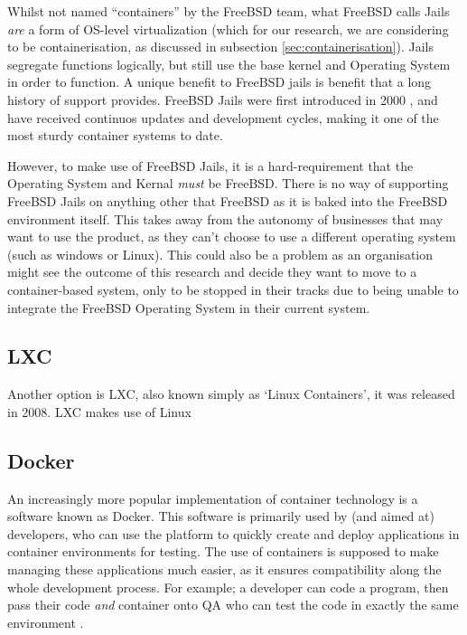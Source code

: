 Whilst not named ``containers'' by the FreeBSD team, what FreeBSD calls Jails \emph{are} a form of OS-level virtualization (which for our research, we are considering to be containerisation, as discussed in subsection \ref{sec:containerisation}). Jails segregate functions logically, but still use the base kernel and Operating System in order to function. A unique benefit to FreeBSD jails is benefit that a long history of support provides. FreeBSD Jails were first introduced in 2000 \citep{FreeBSDJailRelease}, and have received continuos updates and development cycles, making it one of the most sturdy container systems to date.

However, to make use of FreeBSD Jails, it is a hard-requirement that the Operating System and Kernal \emph{must} be FreeBSD. There is no way of supporting FreeBSD Jails on anything other that FreeBSD as it is baked into the FreeBSD environment itself. This takes away from the autonomy of businesses that may want to use the product, as they can't choose to use a different operating system (such as windows or Linux). This could also be a problem as an organisation might see the outcome of this research and decide they want to move to a container-based system, only to be stopped in their tracks due to being unable to integrate the FreeBSD Operating System in their current system.

\subsection{LXC}
Another option is LXC, also known simply as `Linux Containers', it was released in 2008. LXC makes use of Linux 

\subsection{Docker}%
An increasingly more popular implementation of container technology is a software known as Docker. This software is primarily used by (and aimed at) developers, who can use the platform to quickly create and deploy applications in container environments for testing. The use of containers is supposed to make managing these applications much easier, as it ensures compatibility along the whole development process. For example; a developer can code a program, then pass their code \emph{and} container onto QA who can test the code in exactly the same environment \citep{whydocker}.

